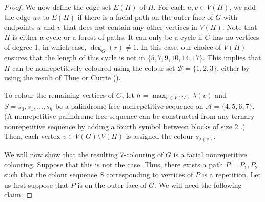 \documentclass{cccg16}
\begin{document}
\begin{proof}
We now define the edge set $E(H)$ of $H$.  For each $u,v\in V(H)$,
we add the edge $uv$ to $E(H)$ if there is a facial path on the outer
face of $G$ with endpoints $u$ and $v$ that does not contain any other
vertices in $V(H)$.  Note that $H$ is either a cycle or a forest of
paths. It can only be a cycle if $G$ has no vertices of degree 1,
in which case, $\deg_G(r)\neq 1$.  In this case, our choice of $V(H)$
ensures that the length of this cycle is not in  $\{5,7,9,10,14,17\}$.
This implies that $H$ can be nonrepetitively coloured using the colour set
$\mathcal{B}=\{1,2,3\}$, either by using the result of Thue \cite{thue1906uber}
or Currie ().

To colour the remaining vertices of $G$, let $h=\max_{v \in
V(G)} \lambda(v)$ and $S=s_0,s_1,\ldots,s_h$ be a palindrome-free
nonrepetitive sequence on $\mathcal{A}=\{4,5,6,7\}$.  (A nonrepetitive
palindrome-free sequence can be constructed from any ternary
nonrepetitive sequence by adding a fourth symbol between blocks of size
2 \cite{brevsar2007nonrepetitive}.) Then, each vertex $v\in V(G)\setminus
V(H)$ is assigned the colour $s_{\lambda(v)}$.

We will now show that the resulting 7-colouring of $G$ is a facial
nonrepetitive colouring. Suppose that this is not the case. Thus,
there exists a path $P=P_1,P_2$ such that the colour sequence $S$
corresponding to vertices of $P$ is a repetition. Let us first suppose
that $P$ is on the outer face of $G$. We will need the following claim:


\end{proof}
\end{document}
